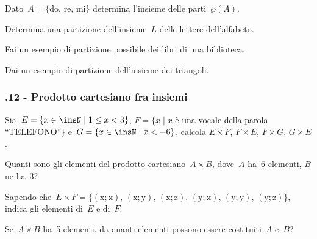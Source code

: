 \begin{esercizio}
\label{ese:\thechapter.68}
Dato~$A=\{\text{do, re, mi}\}$ determina l'insieme delle parti~$\wp (A)$.
\end{esercizio}

\begin{esercizio}
 \label{ese:\thechapter.69}
 Determina una partizione dell'insieme~$L$ delle lettere dell'alfabeto.
\end{esercizio}

\begin{esercizio}
 \label{ese:\thechapter.70}
 Fai un esempio di partizione possibile dei libri di una biblioteca.
\end{esercizio}

\begin{esercizio}
 \label{ese:\thechapter.71}
 Dai un esempio di partizione dell'insieme dei triangoli.
\end{esercizio}

\subsubsection*{\thechapter.12 - Prodotto cartesiano fra insiemi}

\begin{esercizio} %
\label{ese:\thechapter.72}
Sia~$E=\{x\in\insN\mid 1\le x<3\}$, $F=\{x\mid x$ è una vocale della parola ``TELEFONO''$\}$ e~$G=\{x\in\insN\mid x<-6\}$, calcola $E\times F$,  $F\times E$,  $F\times G$,  $G\times E$.
\end{esercizio}

\begin{esercizio} %
 \label{ese:\thechapter.73}
Quanti sono gli elementi del prodotto cartesiano~$A\times B$, dove~$A$ ha~6 elementi, $B$ ne ha~3?
\end{esercizio}


\begin{esercizio} %
 \label{ese:\thechapter.74}
Sapendo che~$E\times F=\{(\text{x};\text{x})\text{, }(\text{x};\text{y})\text{, }(\text{x};\text{z})\text{, }(\text{y};\text{x})\text{, }(\text{y};\text{y})\text{, }(\text{y};\text{z})\}$, indica gli elementi di~$E$ e di~$F$.
\end{esercizio}

\begin{esercizio} %
 \label{ese:\thechapter.75}
Se~$A\times B$ ha~5 elementi, da quanti elementi possono essere costituiti~$A$ e~$B$?
\end{esercizio}

